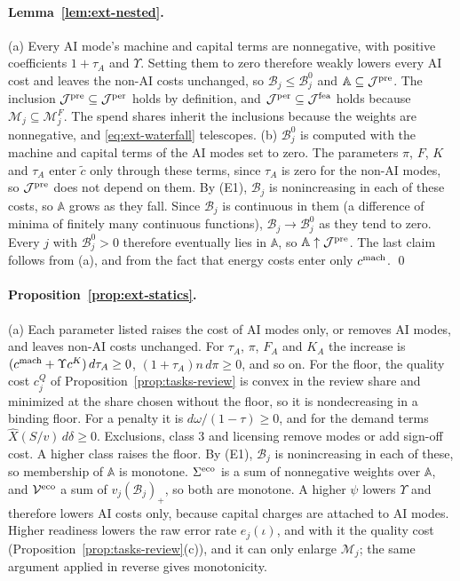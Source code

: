 \paragraph{Lemma~\ref{lem:ext-nested}.} (a) Every AI mode's machine and capital terms are nonnegative, with positive coefficients $1+\tau_A$ and $\Upsilon$. Setting them to zero therefore weakly lowers every AI cost and leaves the non-AI costs unchanged, so $\mathcal B_j\le\mathcal B^0_j$ and $\mathbb A\subseteq\mathcal J^{\rm pre}$. The inclusion $\mathcal J^{\rm pre}\subseteq\mathcal J^{\rm per}$ holds by definition, and $\mathcal J^{\rm per}\subseteq\mathcal J^{\rm fea}$ holds because $\mathcal M_j\subseteq\mathcal M^F_j$. The spend shares inherit the inclusions because the weights are nonnegative, and \eqref{eq:ext-waterfall} telescopes. (b) $\mathcal B^0_j$ is computed with the machine and capital terms of the AI modes set to zero. The parameters $\pi$, $F$, $K$ and $\tau_A$ enter $\tilde c$ only through these terms, since $\tau_A$ is zero for the non-AI modes, so $\mathcal J^{\rm pre}$ does not depend on them. By (E1), $\mathcal B_j$ is nonincreasing in each of these costs, so $\mathbb A$ grows as they fall. Since $\mathcal B_j$ is continuous in them (a difference of minima of finitely many continuous functions), $\mathcal B_j\to\mathcal B^0_j$ as they tend to zero. Every $j$ with $\mathcal B^0_j>0$ therefore eventually lies in $\mathbb A$, so $\mathbb A\uparrow\mathcal J^{\rm pre}$. The last claim follows from (a), and from the fact that energy costs enter only $c^{\rm mach}$. \qed

\paragraph{Proposition~\ref{prop:ext-statics}.} (a) Each parameter listed raises the cost of AI modes only, or removes AI modes, and leaves non-AI costs unchanged. For $\tau_A$, $\pi$, $F_A$ and $K_A$ the increase is $(c^{\rm mach}+\Upsilon c^K)\,d\tau_A\ge0$, $(1+\tau_A)n\,d\pi\ge0$, and so on. For the floor, the quality cost $c^Q_j$ of Proposition~\ref{prop:tasks-review} is convex in the review share and minimized at the share chosen without the floor, so it is nondecreasing in a binding floor. For a penalty it is $d\omega/(1-\tau)\ge0$, and for the demand terms $\hat X(S/v)\,d\delta\ge0$. Exclusions, class 3 and licensing remove modes or add sign-off cost. A higher class raises the floor. By (E1), $\mathcal B_j$ is nonincreasing in each of these, so membership of $\mathbb A$ is monotone. $\Sigma^{\rm eco}$ is a sum of nonnegative weights over $\mathbb A$, and $\mathcal V^{\rm eco}$ a sum of $v_j(\mathcal B_j)_+$, so both are monotone. A higher $\psi$ lowers $\Upsilon$ and therefore lowers AI costs only, because capital charges are attached to AI modes. Higher readiness lowers the raw error rate $e_j(\iota)$, and with it the quality cost (Proposition~\ref{prop:tasks-review}(c)), and it can only enlarge $\mathcal M_j$; the same argument applied in reverse gives monotonicity.

